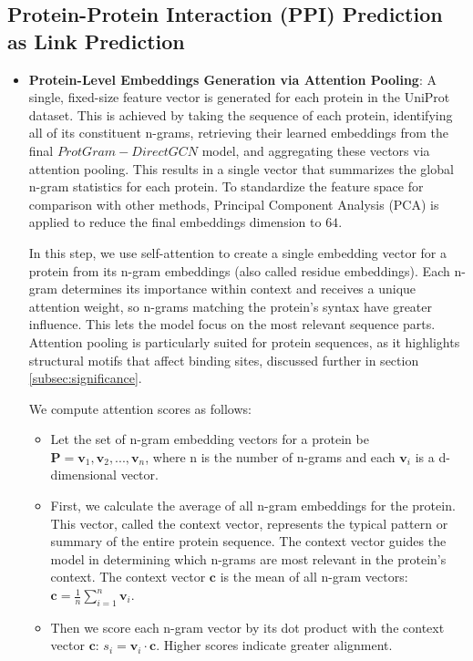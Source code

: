\documentclass[utf8]{article}
\begin{document}
	\subsection{Protein-Protein Interaction (PPI) Prediction as Link Prediction}
	\label{subsec:link}
	\begin{itemize}
		\item \textbf{Protein-Level Embeddings Generation via Attention Pooling}: A single, fixed-size feature vector is generated for each protein in the UniProt dataset. This is achieved by taking the sequence of each protein, identifying all of its constituent n-grams, retrieving their learned embeddings from the final $ProtGram-DirectGCN$ model, and aggregating these vectors via attention pooling. This results in a single vector that summarizes the global n-gram statistics for each protein. To standardize the feature space for comparison with other methods, Principal Component Analysis (PCA) is applied to reduce the final embeddings dimension to $64$.
		
		In this step, we use self-attention to create a single embedding vector for a protein from its n-gram embeddings (also called residue embeddings). Each n-gram determines its importance within context and receives a unique attention weight, so n-grams matching the protein's syntax have greater influence. This lets the model focus on the most relevant sequence parts. Attention pooling is particularly suited for protein sequences, as it highlights structural motifs that affect binding sites, discussed further in section \ref{subsec:significance}.
		
		We compute attention scores as follows:
		\begin{itemize}
			\item Let the set of n-gram embedding vectors for a protein be $\mathbf{P} = {\mathbf{v}_1, \mathbf{v}_2, ..., \mathbf{v}_n}$, where n is the number of n-grams and each $\mathbf{v}_i$ is a d-dimensional vector.
			
			\item First, we calculate the average of all n-gram embeddings for the protein. This vector, called the context vector, represents the typical pattern or summary of the entire protein sequence. The context vector guides the model in determining which n-grams are most relevant in the protein's context. The context vector $\mathbf{c}$ is the mean of all n-gram vectors: $\mathbf{c} = \frac{1}{n} \sum_{i=1}^{n} \mathbf{v}_i.$
			
			\item Then we score each n-gram vector by its dot product with the context vector $\mathbf{c}$: $s_i = \mathbf{v}_i \cdot \mathbf{c}$. Higher scores indicate greater alignment.
			

\end{itemize}
\end{itemize}
\end{document}
